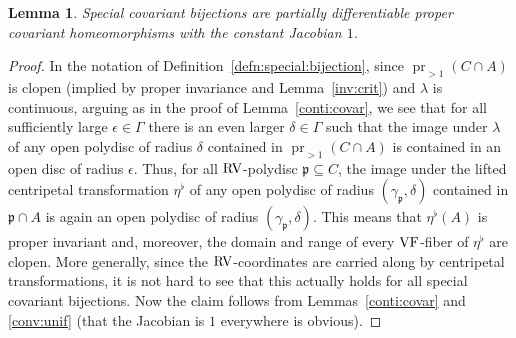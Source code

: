\documentclass[12pt]{amsart}
\theoremstyle{plain}
\newtheorem{lem}[thm]{Lemma}
\theoremstyle{definition}
\theoremstyle{remark}
\numberwithin{equation}{section}
\theoremstyle{plain}
\newcommand{\VF}{\textup{VF}}
\newcommand{\RV}{\textup{RV}}
\DeclareMathOperator{\pr}{pr}
\newcommand{\gp}{\mathfrak{p}}
\newcommand{\0}{\emptyset}
\newcommand{\sub}{\subseteq}
\begin{document}
\begin{lem}\label{spec:inve}
Special covariant bijections  are  partially differentiable proper covariant homeomorphisms with the constant Jacobian $1$.
\end{lem}
\begin{proof}
In the notation of Definition~\ref{defn:special:bijection}, since $\pr_{>1}(C \cap A)$ is clopen (implied by proper invariance and Lemma~\ref{inv:crit}) and  $\lambda$ is  continuous, arguing as in the proof of Lemma~\ref{conti:covar}, we see that for all sufficiently large $\epsilon \in \Gamma$ there is an even larger $\delta \in \Gamma$ such that the image under $\lambda$ of any open polydisc of radius $\delta$ contained in $\pr_{>1}(C \cap A)$ is contained in an open disc of radius $\epsilon$. Thus, for all $\RV$-polydisc $\gp \sub C$, the image under the lifted centripetal transformation $\eta^\flat$ of any open polydisc of radius $(\gamma_{\gp}, \delta)$ contained in $\gp  \cap A$ is again an open polydisc of radius $(\gamma_{\gp}, \delta)$. This means that $\eta^\flat(A)$ is proper invariant and, moreover, the domain and range of every $\VF$-fiber of $\eta^\flat$ are clopen. More generally, since the $\RV$-coordinates are carried along by centripetal transformations, it is not hard to see that this actually holds  for all  special covariant bijections. Now the claim follows from  Lemmas~\ref{conti:covar} and \ref{conv:unif} (that the Jacobian is $1$ everywhere is obvious).
\end{proof}
\end{document}
